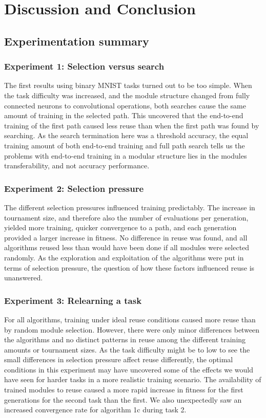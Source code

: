 \chapter{Discussion and Conclusion}

\section{Experimentation summary}
\subsection{Experiment 1: Selection versus search}
The first results using binary MNIST tasks turned out to be too simple. When the task difficulty was increased, and the module structure changed from fully connected neurons to convolutional operations, both searches cause the same amount of training in the selected path. This uncovered that the end-to-end training of the first path caused less reuse than when the first path was found by searching. As the search termination here was a threshold accuracy, the equal training amount of both end-to-end training and full path search tells us the problems with end-to-end training in a modular structure lies in the modules transferability, and not accuracy performance.

\subsection{Experiment 2: Selection pressure}
The different selection pressures influenced training predictably. The increase in tournament size, and therefore also the number of evaluations per generation, yielded more training, quicker convergence to a path, and each generation provided a larger increase in fitness. No difference in reuse was found, and all algorithms reused less than would have been done if all modules were selected randomly. As the exploration and exploitation of the algorithms were put in terms of selection pressure, the question of how these factors influenced reuse is unanswered. 

\subsection{Experiment 3: Relearning a task}
For all algorithms, training under ideal reuse conditions caused more reuse than by random module selection. However, there were only minor differences between the algorithms and no distinct patterns in reuse among the different training amounts or tournament sizes. As the task difficulty might be to low to see the small differences in selection pressure affect reuse differently, the optimal conditions in this experiment may have uncovered some of the effects we would have seen for harder tasks in a more realistic training scenario. The availability of trained modules to reuse caused a more rapid increase in fitness for the first generations for the second task than the first. We also unexpectedly saw an increased convergence rate for algorithm 1c during task 2.  

